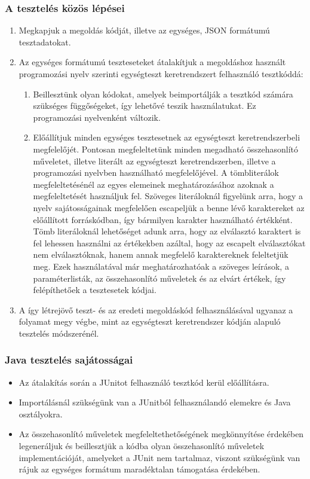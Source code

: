 \documentclass{elteikthesis}
\begin{document}
				\subsubsection{A tesztelés közös lépései}
					\begin{enumerate}
						\item Megkapjuk a megoldás kódját, illetve az egységes, JSON formátumú tesztadatokat.
						\item Az egységes formátumú teszteseteket átalakítjuk a megoldáshoz használt programozási nyelv szerinti egységteszt keretrendszert felhasználó tesztkóddá:
						\begin{enumerate}
							\item Beillesztünk olyan kódokat, amelyek beimportálják a tesztkód számára szükséges függőségeket, így lehetővé teszik használatukat. Ez programozási nyelvenként változik.
							\item Előállítjuk minden egységes tesztesetnek az egységteszt keretrendszerbeli megfelelőjét. Pontosan megfeleltetünk minden megadható összehasonlító műveletet, illetve literált az egységteszt keretrendszerben, illetve a programozási nyelvben használható megfelelőjével. A tömbliterálok megfeleltetésénél az egyes elemeinek meghatározásához azoknak a megfeleltetését használjuk fel. Szöveges literáloknál figyelünk arra, hogy a nyelv sajátosságainak megfelelően escapeljük a benne lévő karaktereket az előállított forráskódban, így bármilyen karakter használható értékként. Tömb literáloknál lehetőséget adunk arra, hogy az elválasztó karaktert is fel lehessen használni az értékekben azáltal, hogy az escapelt elválasztókat nem elválasztóknak, hanem annak megfelelő karaktereknek feleltetjük meg. Ezek használatával már meghatározhatóak a szöveges leírások, a paraméterlisták, az összehasonlító műveletek és az elvárt értékek, így felépíthetőek a tesztesetek kódjai.
						\end{enumerate}
						\item A így létrejövő teszt- és az eredeti megoldáskód felhasználásával ugyanaz a folyamat megy végbe, mint az egységteszt keretrendszer kódján alapuló tesztelés módszerénél.
					\end{enumerate}

				\subsubsection{Java tesztelés sajátosságai}
					\begin{itemize}
						\item Az átalakítás során a JUnitot felhasználó tesztkód kerül előállításra.
						\item Importálásnál szükségünk van a JUnitból felhasználandó elemekre és Java osztályokra.
						\item Az összehasonlító műveletek megfeleltethetőségének megkönnyítése érdekében legeneráljuk és beillesztjük a kódba olyan összehasonlító műveletek implementációját, amelyeket a JUnit nem tartalmaz, viszont szükségünk van rájuk az egységes formátum maradéktalan támogatása érdekében.
					\end{itemize}
								
\end{document}
